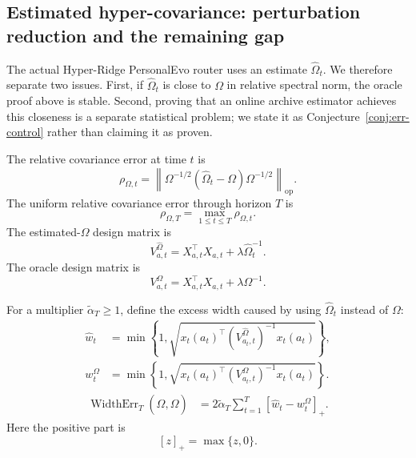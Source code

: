 \documentclass{article} %
\begin{document}
\subsection{Estimated hyper-covariance: perturbation reduction and the remaining gap}
\label{sec:theory-estimated-hyper}

The actual Hyper-Ridge PersonalEvo router uses an estimate \(\widehat{\Omega}_t\).  We therefore separate two issues.  First, if \(\widehat{\Omega}_t\) is close to \(\Omega\) in relative spectral norm, the oracle proof above is stable.  Second, proving that an online archive estimator achieves this closeness is a separate statistical problem; we state it as Conjecture~\ref{conj:err-control} rather than claiming it as proven.

The relative covariance error at time \(t\) is
\begin{equation}
\label{eq:hyper-est-rho-t}
\rho_{\Omega,t}
=
\left\|
\Omega^{-1/2}
\left(
\widehat{\Omega}_t-\Omega
\right)
\Omega^{-1/2}
\right\|_{\mathrm{op}} .
\end{equation}
The uniform relative covariance error through horizon \(T\) is
\begin{equation}
\label{eq:hyper-est-rho-T}
\rho_{\Omega,T}
=
\max_{1\le t\le T}\rho_{\Omega,t} .
\end{equation}
The estimated-\(\Omega\) design matrix is
\begin{equation}
\label{eq:hyper-est-Vhat}
V_{a,t}^{\widehat{\Omega}}
=
X_{a,t}^{\top}X_{a,t}
+
\lambda \widehat{\Omega}_t^{-1}.
\end{equation}
The oracle design matrix is
\begin{equation}
\label{eq:hyper-est-Vomega}
V_{a,t}^{\Omega}
=
X_{a,t}^{\top}X_{a,t}
+
\lambda \Omega^{-1}.
\end{equation}

For a multiplier \(\widetilde\alpha_T\ge1\), define the excess width caused by
using \(\widehat\Omega_t\) instead of \(\Omega\):
\begin{align}
\widehat w_t
&=
\min\!\left\{
1,
\sqrt{
x_t(a_t)^\top
\left(V_{a_t,t}^{\widehat\Omega}\right)^{-1}
x_t(a_t)}
\right\},
\\
w_t^\Omega
&=
\min\!\left\{
1,
\sqrt{
x_t(a_t)^\top
\left(V_{a_t,t}^{\Omega}\right)^{-1}
x_t(a_t)}
\right\}.
\end{align}
\begin{align}
\label{eq:hyper-est-err-def}
\operatorname{WidthErr}_T(\widehat{\Omega},\Omega)
&=
2\widetilde\alpha_T
\sum_{t=1}^{T}
\left[\widehat w_t-w_t^\Omega\right]_{+}.
\end{align}
Here the positive part is
\begin{equation}
\label{eq:hyper-est-positive-part}
[z]_{+}
=
\max\{z,0\}.
\end{equation}
\end{document}
